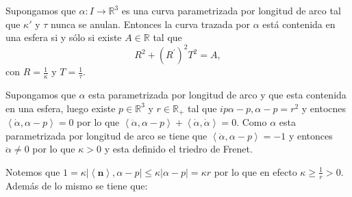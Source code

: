 \documentclass[11pt]{article}
\newcommand{\R}{{\mathbb{R}}}
\newcommand\abs[1]{\left\lvert#1\right\rvert}
\newcommand\ip[1]{\left\langle#1\right\rangle}
\newcommand\nn{\mathbf{n}}
\newenvironment{proof}[1][Demostraci\'on]{\begin{trivlist}
		\item[\hskip \labelsep {\bfseries #1}]}{\end{trivlist}}
\begin{document}
\begin{enumerate}
	
	
	

	\item Supongamos que $\alpha: I \to \R^3$ es una curva parametrizada por longitud de arco tal que $\kappa'$ y $\tau$ nunca se anulan.
	Entonces la curva trazada por $\alpha$ est\'a contenida en una esfera si y s\'olo si existe
	$A\in\R$ tal que
	\[
	R^2+(R^{\prime})^2T^2=A,
	\]
	con $R=\frac1\kappa$ y $T=\frac1\tau$.
	
	\label{Ejercicio 14}
	
	\begin{proof}
		
		Supongamos que $\alpha$ esta parametrizada por longitud de arco y que esta contenida en una esfera, luego existe $p \in \R^3$ y $r \in \R_{+}$ tal que $ip{\alpha-p , \alpha -p } = r^2$ y entocnes $\ip{\dot{\alpha} , \alpha -p } = 0$ por lo que $\ip{\ddot{\alpha}, \alpha - p} + \ip{\dot{\alpha} , \dot{\alpha}} = 0$. Como $\alpha$ esta parametrizada por longitud de arco se tiene que $\ip{\ddot{\alpha} , \alpha-p} = -1$ y entonces $\ddot{\alpha} \neq 0 $ por lo que $\kappa > 0 $ y esta definido el triedro de Frenet.
		
		Notemos que $1 = \kappa \abs{\ip{\nn} , \alpha - p} \leq \kappa \abs{\alpha -p} = \kappa r$ por lo que en efecto $\kappa \geq \frac{1}{r} > 0$. Adem\'as de lo mismo se tiene que:
		

\end{proof}
\end{enumerate}
\end{document}
